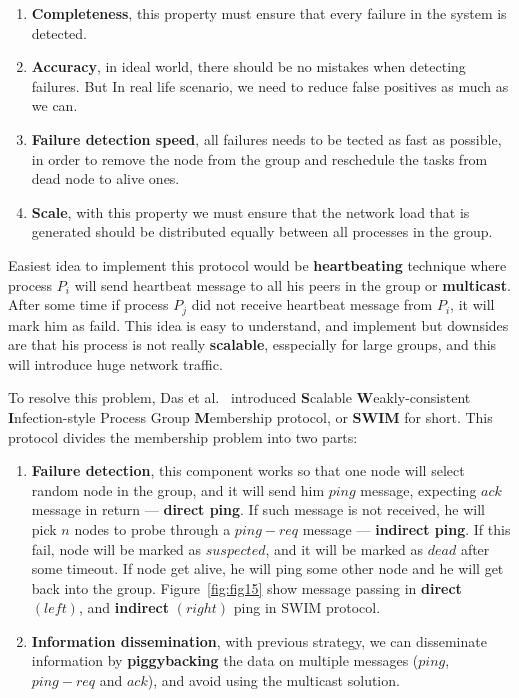 \begin{enumerate}[start=1,label={(\bfseries \arabic*)}] \label{ds:features}
	\item \textbf{Completeness}, this property must ensure that every failure in the system is detected.
	\item \textbf{Accuracy}, in ideal world, there should be no mistakes when detecting failures. But In real life scenario, we need to reduce false positives as much as we can.
	\item \textbf{Failure detection speed}, all failures needs to be tected as fast as possible, in order to remove the node from the group and reschedule the tasks from dead node to alive ones.
	\item \textbf{Scale}, with this property we must ensure that the network load that is generated should be distributed equally between all processes in the group.
\end{enumerate}

Easiest idea to implement this protocol would be \textbf{heartbeating} technique where process $P_i$ will send heartbeat message to all his peers in the group or \textbf{multicast}. After some time if process $P_j$ did not receive heartbeat message from $P_i$, it will mark him as faild. This idea is easy to understand, and implement but downsides are that his process is not really \textbf{scalable}, esspecially for large groups, and this will introduce huge network traffic.

To resolve this problem, Das et al.~\cite{DasGM02} introduced \textbf{S}calable \textbf{W}eakly-consistent \textbf{I}nfection-style Process Group \textbf{M}embership protocol, or \textbf{SWIM} for short. This protocol divides the membership problem into two parts:

\begin{enumerate}[start=1,label={(\bfseries \arabic*)}]
	\item \textbf{Failure detection}, this component works so that one node will select random node in the group, and it will send him $ping$ message, expecting $ack$ message in return --- \textbf{direct ping}. If such message is not received, he will pick $n$ nodes to probe through a $ping-req$ message --- \textbf{indirect ping}. If this fail, node will be marked as $suspected$, and it will be marked as $dead$ after some timeout. If node get alive, he will ping some other node and he will get back into the group. Figure~\ref{fig:fig15} show message passing in \textbf{direct} $(left)$, and \textbf{indirect} $(right)$ ping in SWIM protocol.
	\item \textbf{Information dissemination}, with previous strategy, we can disseminate information by \textbf{piggybacking} the data on multiple messages ($ping$, $ping-req$ and $ack$), and avoid using the multicast solution.
\end{enumerate}

